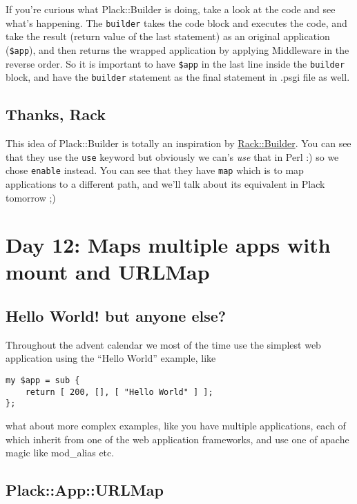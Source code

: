 If you're curious what Plack::Builder is doing, take a look at the code
and see what's happening. The \lstinline!builder! takes the code block
and executes the code, and take the result (return value of the last
statement) as an original application (\lstinline!$app!), and then
returns the wrapped application by applying Middleware in the reverse
order. So it is important to have \lstinline!$app! in the last line
inside the \lstinline!builder! block, and have the \lstinline!builder!
statement as the final statement in .psgi file as well.

\section{Thanks, Rack}\label{thanks-rack}

This idea of Plack::Builder is totally an inspiration by
\href{http://m.onkey.org/2008/11/18/ruby-on-rack-2-rack-builder}{Rack::Builder}.
You can see that they use the \lstinline!use! keyword but obviously we
can's \emph{use} that in Perl :) so we chose \lstinline!enable! instead.
You can see that they have \lstinline!map! which is to map applications
to a different path, and we'll talk about its equivalent in Plack
tomorrow ;)

\chapter{Day 12: Maps multiple apps with mount and
URLMap}\label{day-12-maps-multiple-apps-with-mount-and-urlmap}

\section{Hello World! but anyone
else?}\label{hello-world-but-anyone-else}

Throughout the advent calendar we most of the time use the simplest web
application using the ``Hello World'' example, like

\begin{lstlisting}
my $app = sub {
    return [ 200, [], [ "Hello World" ] ];
};
\end{lstlisting}

what about more complex examples, like you have multiple applications,
each of which inherit from one of the web application frameworks, and
use one of apache magic like mod\_alias etc.

\section{Plack::App::URLMap}\label{plackappurlmap}

